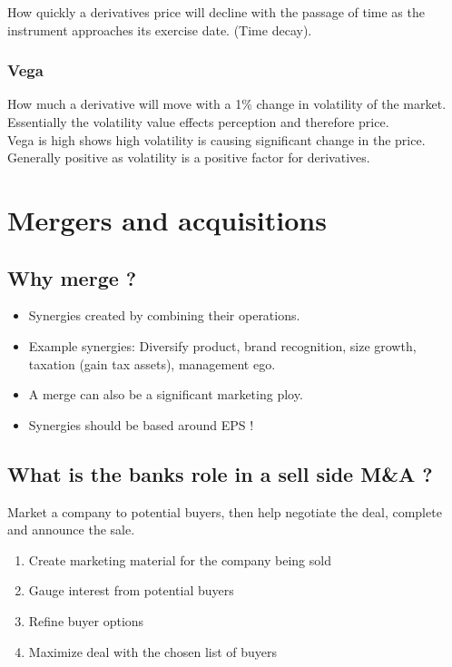 \documentclass[11pt]{scrartcl} %
\begin{document}
How quickly a derivatives price will decline with the passage of time as the instrument approaches its exercise date. (Time decay).

\subsubsection{Vega}

How much a derivative will move with a 1\% change in volatility of the market. \\

Essentially the volatility value effects perception and therefore price.\\

Vega is high shows high volatility is causing significant change in the price. Generally positive as volatility is a positive factor for derivatives.

\section{Mergers and acquisitions}

\subsection{Why merge ?}

\begin{itemize}
	\item Synergies created by combining their operations.
	\item Example synergies: Diversify product, brand recognition, size growth, taxation (gain tax assets), management ego.
	\item A merge can also be a significant marketing ploy.
	\item Synergies should be based around EPS !
\end{itemize}

\subsection{What is the banks role in a sell side M\&A ?}

Market a company to potential buyers, then help negotiate the deal, complete and announce the sale.

\begin{enumerate}
	\item Create marketing material for the company being sold
	\item Gauge interest from potential buyers
	\item Refine buyer options
	\item Maximize deal with the chosen list of buyers 
\end{enumerate}
\end{document}
